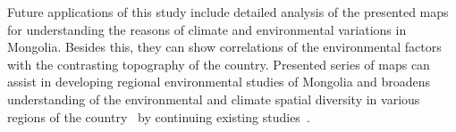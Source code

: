 \documentclass[geosciences,article,accept,pdftex,oneauthor]{Definitions/mdpi}
\begin{document}
Future applications of this study include detailed analysis of the presented maps for understanding the reasons of climate and environmental variations in Mongolia. Besides this, they can show correlations of the environmental factors with the contrasting topography of the country. Presented series of maps can assist in developing regional environmental studies of Mongolia and broadens understanding of the environmental and climate spatial diversity in various regions of the country~\cite{MAS,Pfeiffer} by continuing existing studies~\cite{Altanbold,Jamyansuren,Jugder}. 



\end{document}
